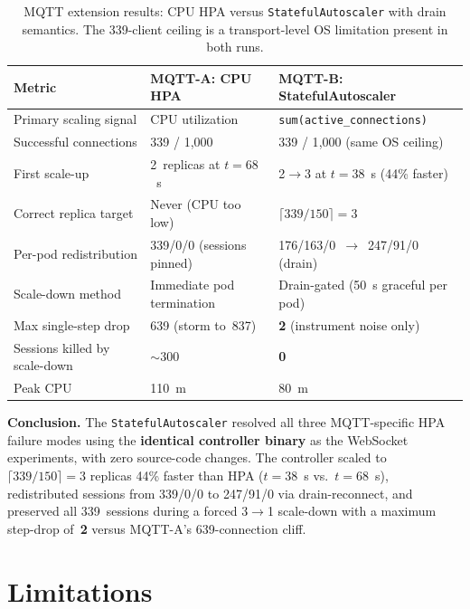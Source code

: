 \documentclass[twocolumn]{svjour3}
\begin{document}
\begin{table}[t]
\centering
\caption{MQTT extension results: CPU HPA versus \texttt{StatefulAutoscaler} with drain
semantics. The 339-client ceiling is a transport-level OS limitation present in both runs.}
\label{tab:mqtt_results}
\begin{tabular}{@{}p{4.2cm}p{4.8cm}p{4.8cm}@{}}
\toprule
\rowcolor{gray!12}
\textbf{Metric} & \textbf{MQTT-A: CPU HPA} & \textbf{MQTT-B: StatefulAutoscaler} \\
\midrule
Primary scaling signal & CPU utilization & \texttt{sum(active\_connections)} \\
Successful connections & 339 / 1{,}000 & 339 / 1{,}000 (same OS ceiling) \\
First scale-up & 2~replicas at $t=68$~s & 2$\rightarrow$3 at $t=38$~s (44\% faster) \\
Correct replica target & Never (CPU too low) & $\lceil 339/150 \rceil = 3$ \\
Per-pod redistribution & 339/0/0 (sessions pinned) & 176/163/0~$\rightarrow$~247/91/0 (drain) \\
Scale-down method & Immediate pod termination & Drain-gated (50~s graceful per pod) \\
Max single-step drop & 639 (storm to~837) & \textbf{2} (instrument noise only) \\
Sessions killed by scale-down & $\sim$300 & \textbf{0} \\
Peak CPU & 110~m & 80~m \\
\bottomrule
\end{tabular}
\end{table}

\begin{keyresult}
\noindent\textbf{Conclusion.} The \texttt{StatefulAutoscaler} resolved all three MQTT-specific
HPA failure modes using the \textbf{identical controller binary} as the WebSocket experiments,
with zero source-code changes. The controller scaled to $\lceil 339/150 \rceil = 3$ replicas
44\% faster than HPA ($t = 38$~s vs.\ $t = 68$~s), redistributed sessions from 339/0/0 to
247/91/0 via drain-reconnect, and preserved all 339~sessions during a forced 3$\rightarrow$1
scale-down with a maximum step-drop of~\textbf{2} versus MQTT-A's 639-connection cliff.
\end{keyresult}



\section{Limitations}
\label{sec:limitations}
\end{document}
